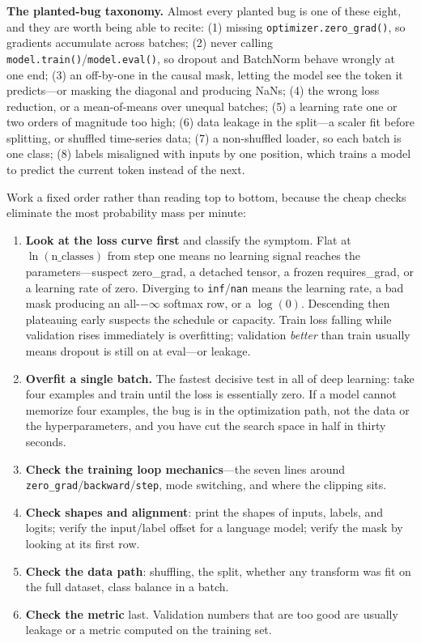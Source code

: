 \begin{keyinsight}
\textbf{The planted-bug taxonomy.} Almost every planted bug is one of these eight, and they are worth being able to recite: (1) missing \texttt{optimizer.zero\_grad()}, so gradients accumulate across batches; (2) never calling \texttt{model.train()}/\texttt{model.eval()}, so dropout and BatchNorm behave wrongly at one end; (3) an off-by-one in the causal mask, letting the model see the token it predicts---or masking the diagonal and producing NaNs; (4) the wrong loss reduction, or a mean-of-means over unequal batches; (5) a learning rate one or two orders of magnitude too high; (6) data leakage in the split---a scaler fit before splitting, or shuffled time-series data; (7) a non-shuffled loader, so each batch is one class; (8) labels misaligned with inputs by one position, which trains a model to predict the current token instead of the next.
\end{keyinsight}

Work a fixed order rather than reading top to bottom, because the cheap checks eliminate the most probability mass per minute:

\begin{enumerate}
    \item \textbf{Look at the loss curve first} and classify the symptom. Flat at $\ln(\text{n\_classes})$ from step one means no learning signal reaches the parameters---suspect zero\_grad, a detached tensor, a frozen requires\_grad, or a learning rate of zero. Diverging to \texttt{inf}/\texttt{nan} means the learning rate, a bad mask producing an all-$-\infty$ softmax row, or a $\log(0)$. Descending then plateauing early suspects the schedule or capacity. Train loss falling while validation rises immediately is overfitting; validation \emph{better} than train usually means dropout is still on at eval---or leakage.
    \item \textbf{Overfit a single batch.} The fastest decisive test in all of deep learning: take four examples and train until the loss is essentially zero. If a model cannot memorize four examples, the bug is in the optimization path, not the data or the hyperparameters, and you have cut the search space in half in thirty seconds.
    \item \textbf{Check the training loop mechanics}---the seven lines around \texttt{zero\_grad}/\texttt{backward}/\texttt{step}, mode switching, and where the clipping sits.
    \item \textbf{Check shapes and alignment}: print the shapes of inputs, labels, and logits; verify the input/label offset for a language model; verify the mask by looking at its first row.
    \item \textbf{Check the data path}: shuffling, the split, whether any transform was fit on the full dataset, class balance in a batch.
    \item \textbf{Check the metric} last. Validation numbers that are too good are usually leakage or a metric computed on the training set.
\end{enumerate}

